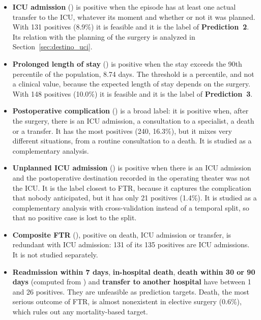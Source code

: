 \begin{itemize}[leftmargin=*]
  \item \textbf{ICU admission} () is positive when the episode has at least one actual transfer to the ICU, whatever its moment and whether or not it was planned. With 131 positives (8.9\%) it is feasible and it is the label of \textbf{Prediction~2}. Its relation with the planning of the surgery is analyzed in Section~\ref{sec:destino_uci}.
  \item \textbf{Prolonged length of stay} () is positive when the stay exceeds the 90th percentile of the population, 8.74 days. The threshold is a percentile, and not a clinical value, because the expected length of stay depends on the surgery. With 148 positives (10.0\%) it is feasible and it is the label of \textbf{Prediction~3}.
  \item \textbf{Postoperative complication} () is a broad label: it is positive when, after the surgery, there is an ICU admission, a consultation to a specialist, a death or a transfer. It has the most positives (240, 16.3\%), but it mixes very different situations, from a routine consultation to a death. It is studied as a complementary analysis.
  \item \textbf{Unplanned ICU admission} () is positive when there is an ICU admission and the postoperative destination recorded in the operating theater was not the ICU. It is the label closest to FTR, because it captures the complication that nobody anticipated, but it has only 21 positives (1.4\%). It is studied as a complementary analysis with cross-validation instead of a temporal split, so that no positive case is lost to the split.
  \item \textbf{Composite FTR} (), positive on death, ICU admission or transfer, is redundant with ICU admission: 131 of its 135 positives are ICU admissions. It is not studied separately.
  \item \textbf{Readmission within 7 days}, \textbf{in-hospital death}, \textbf{death within 30 or 90 days} (computed from ) and \textbf{transfer to another hospital} have between 1 and 26 positives. They are unfeasible as prediction targets. Death, the most serious outcome of FTR, is almost nonexistent in elective surgery (0.6\%), which rules out any mortality-based target.
\end{itemize}

